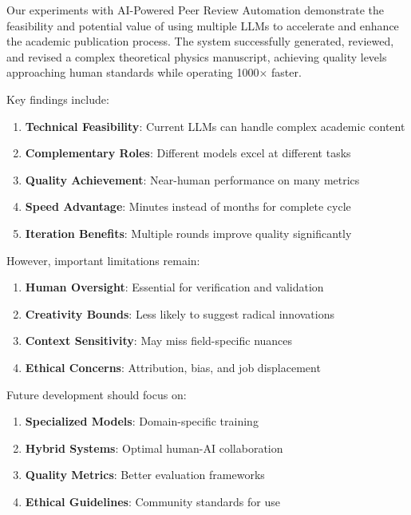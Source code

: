 \documentclass[11pt,a4paper]{article}
\begin{document}
Our experiments with AI-Powered Peer Review Automation demonstrate the feasibility and potential value of using multiple LLMs to accelerate and enhance the academic publication process. The system successfully generated, reviewed, and revised a complex theoretical physics manuscript, achieving quality levels approaching human standards while operating 1000$\times$ faster.

Key findings include:

\begin{enumerate}
    \item \textbf{Technical Feasibility}: Current LLMs can handle complex academic content
    \item \textbf{Complementary Roles}: Different models excel at different tasks
    \item \textbf{Quality Achievement}: Near-human performance on many metrics
    \item \textbf{Speed Advantage}: Minutes instead of months for complete cycle
    \item \textbf{Iteration Benefits}: Multiple rounds improve quality significantly
\end{enumerate}

However, important limitations remain:

\begin{enumerate}
    \item \textbf{Human Oversight}: Essential for verification and validation
    \item \textbf{Creativity Bounds}: Less likely to suggest radical innovations
    \item \textbf{Context Sensitivity}: May miss field-specific nuances
    \item \textbf{Ethical Concerns}: Attribution, bias, and job displacement
\end{enumerate}

Future development should focus on:

\begin{enumerate}
    \item \textbf{Specialized Models}: Domain-specific training
    \item \textbf{Hybrid Systems}: Optimal human-AI collaboration
    \item \textbf{Quality Metrics}: Better evaluation frameworks
    \item \textbf{Ethical Guidelines}: Community standards for use
\end{enumerate}
\end{document}

